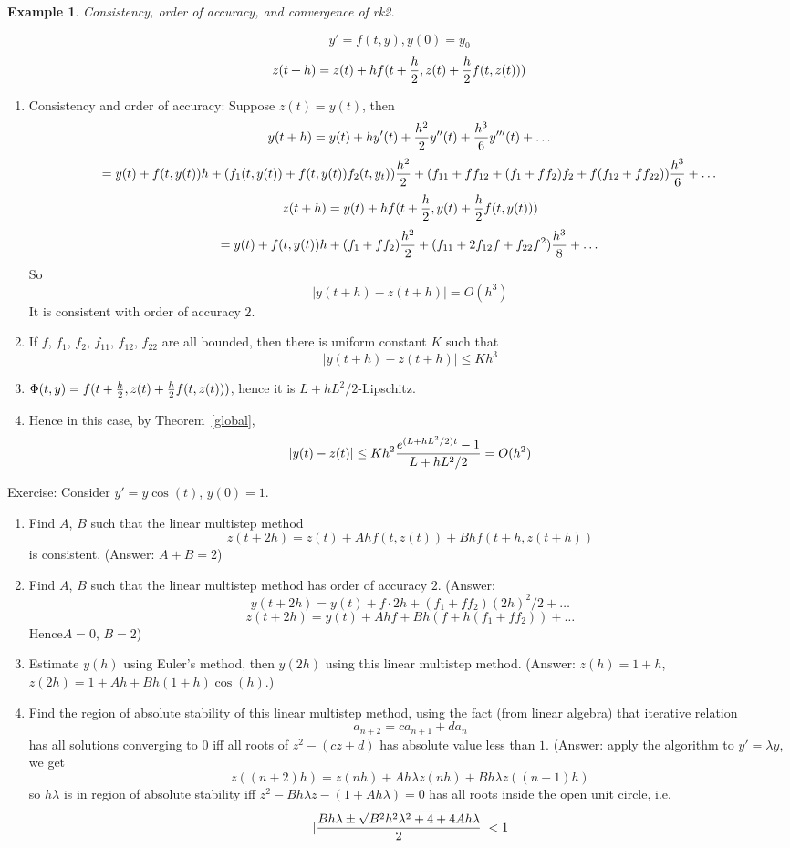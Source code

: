 \documentclass[20pt]{article} %
\theoremstyle{break}
\newtheorem{exa}[definition]{Example}
\begin{document}
\begin{exa}Consistency, order of accuracy, and convergence of rk2.\end{exa}
\[y'=f(t, y), y(0)=y_0\]
\[z(t+h)=z(t)+hf(t+{h\over 2}, z(t)+{h\over 2}f(t, z(t)))\]
\begin{enumerate}
\item Consistency and order of accuracy:
  Suppose $z(t)=y(t)$, then
  \[y(t+h)=y(t)+hy'(t)+{h^2\over 2}y''(t)+{h^3\over 6}y'''(t)+\dots\]
  \[=y(t)+f(t, y(t))h+(f_1(t, y(t))+f(t, y(t))f_2(t, y_t)){h^2\over 2}+(f_{11}+ff_{12}+(f_1+ff_2)f_2+f(f_{12}+ff_{22})){h^3\over 6}+\dots\]
  \[z(t+h)=y(t)+hf(t+{h\over 2}, y(t)+{h\over 2}f(t, y(t)))\]
  \[=y(t)+f(t, y(t))h+(f_1+ff_2){h^2\over 2}+(f_{11}+2f_{12}f+f_{22}f^2){h^3\over 8}+\dots\]
  So
  \[|y(t+h)-z(t+h)|=O(h^3)\]
  It is consistent with order of accuracy $2$.
\newpage
\item If $f$, $f_1$, $f_2$, $f_{11}$, $f_{12}$, $f_{22}$ are all bounded, then there is uniform constant $K$ such that
  \[|y(t+h)-z(t+h)|\leq Kh^3\]
\item $\Phi(t, y)=f(t+{h\over 2}, z(t)+{h\over 2}f(t, z(t)))$, hence it is $L+hL^2/2$-Lipschitz.
\item Hence in this case, by Theorem~\ref{global}, 
  \[|y(t)-z(t)|\leq Kh^2{e^{(L+hL^2/2)t}-1\over L+hL^2/2}=O(h^2)\]
\end{enumerate}

\newpage

Exercise: Consider $y'=y\cos(t)$, $y(0)=1$.
\begin{enumerate}
\item Find $A$, $B$ such that the linear multistep method
  \[z(t+2h)=z(t)+Ahf(t, z(t))+Bhf(t+h, z(t+h))\]
  is consistent. (Answer: $A+B=2$)
\item Find $A$, $B$ such that the linear multistep method has order of accuracy $2$. (Answer:
  \[y(t+2h)=y(t)+f\cdot 2h+(f_1+ff_2)(2h)^2/2+\dots\]
\[z(t+2h)=y(t)+Ahf+Bh(f+h(f_1+ff_2))+\dots\]
  Hence$A=0$, $B=2$)
  
\newpage

\item Estimate $y(h)$ using Euler's method, then $y(2h)$ using this linear multistep method. (Answer: $z(h)=1+h$, $z(2h)=1+Ah+Bh(1+h)\cos(h)$.)
\item Find the region of absolute stability of this linear multistep method, using the fact (from linear algebra) that iterative relation
  \[a_{n+2}=ca_{n+1}+da_n\]
  has all solutions converging to $0$ iff all roots of $z^2-(cz+d)$ has absolute value less than $1$. (Answer: apply the algorithm to $y'=\lambda y$, we get
  \[z((n+2)h)=z(nh)+Ah\lambda z(nh)+Bh\lambda z((n+1)h)\]
  so $h\lambda$ is in region of absolute stability iff $z^2-Bh\lambda z-(1+Ah\lambda)=0$ has all roots inside the open unit circle, i.e.
  \[|{Bh\lambda\pm\sqrt{B^2h^2\lambda^2+4+4Ah\lambda}\over 2}|<1\]
\end{enumerate}
\end{document}
